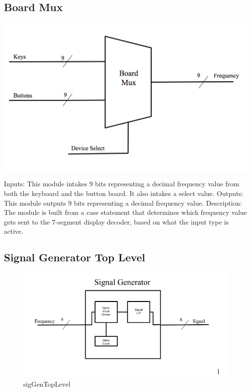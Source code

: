\documentclass[a4paper]{article}
\begin{document}
\subsection{Board Mux}


    \includegraphics[width=6 in]{./Images/jackPictures/boardMUX.png}

Inputs: This module intakes 9 bits representing a decimal frequency value from both the keyboard and the button board. It also intakes a select value.
\newline\newline
Outputs: This module outputs 9 bits representing a decimal frequency value.
\newline\newline
Description: The module is built from a case statement that determines which frequency value gets sent to the 7-segment display decoder, based on what the input type is active.


\subsection{Signal Generator Top Level}

\begin{figure}[h]
    \includegraphics[width=6 in]{./Images/chasePictures/sigTopMod.png}
    \caption{sigGenTopLevel}
    \label{fig:12}
\end{figure}
\end{document}
